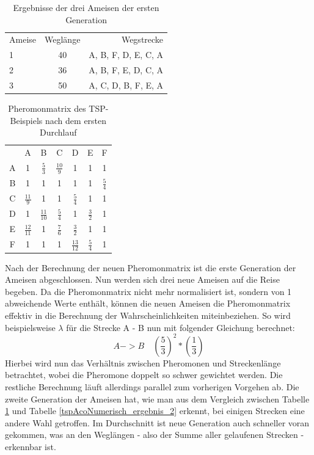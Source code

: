 	\begin{table}
		\centering
		\footnotesize
		\begin{tabular}{l c r}
			Ameise & Weglänge & Wegstrecke \\
			1 & 40 & A, B, F, D, E, C, A\\
			2 & 36 & A, B, F, E, D, C, A\\ 
			3 & 50 & A, C, D, B, F, E, A\\
		\end{tabular}
		\caption{Ergebnisse der drei Ameisen der ersten Generation}
		\label{tspAcoNumerisch_ergebnis_1}
	\end{table}
	
	\begin{table}
		\centering
		\footnotesize
		\begin{tabular}{c c c c c c c}
			& A & B & C & D & E & F \\
			A & 1 & $\frac{5}{3}$ & $\frac{10}{9}$ & 1 & 1 & 1\\ 
			B & 1 & 1 & 1 & 1 & 1 & $\frac{5}{4}$\\ 
			C & $\frac{11}{9}$ & 1 & 1 & $\frac{5}{4}$ & 1 & 1\\
			D & 1 & $\frac{11}{10}$ & $\frac{5}{4}$ & 1 & $\frac{3}{2}$ & 1\\
			E & $\frac{12}{11}$ & 1 & $\frac{7}{6}$ & $\frac{3}{2}$ & 1 & 1\\
			F & 1 & 1 & 1 & $\frac{13}{12}$ & $\frac{5}{4}$ & 1\\
		\end{tabular}
		\caption{Pheromonmatrix des TSP-Beispiels nach dem ersten Durchlauf}
	\label{tspAcoNumerisch_pheromon_1}
	\end{table}

	Nach der Berechnung der neuen Pheromonmatrix ist die erste Generation der Ameisen abgeschlossen. Nun werden sich drei neue Ameisen auf die Reise begeben. Da die Pheromonmatrix nicht mehr normalisiert ist, sondern von 1 abweichende Werte enthält, können die neuen Ameisen die Pheromonmatrix effektiv in die Berechnung der Wahrscheinlichkeiten miteinbeziehen. So wird beispielsweise $\lambda$ für die Strecke A - B nun mit folgender Gleichung berechnet:	
	\begin{equation}
		A -> B \quad (\frac{5}{3})^2 * (\frac{1}{3})
	\end{equation}
	Hierbei wird nun das Verhältnis zwischen Pheromonen und Streckenlänge betrachtet, wobei die Pheromone doppelt so schwer gewichtet werden. Die restliche Berechnung läuft allerdings parallel zum vorherigen Vorgehen ab. Die zweite Generation der Ameisen hat, wie man aus dem Vergleich zwischen Tabelle \ref{tspAcoNumerisch_ergebnis_1} und Tabelle \ref{tspAcoNumerisch_ergebnis_2} erkennt, bei einigen Strecken eine andere Wahl getroffen. Im Durchschnitt ist neue Generation auch schneller voran gekommen, was an den Weglängen - also der Summe aller gelaufenen Strecken - erkennbar ist.
	
